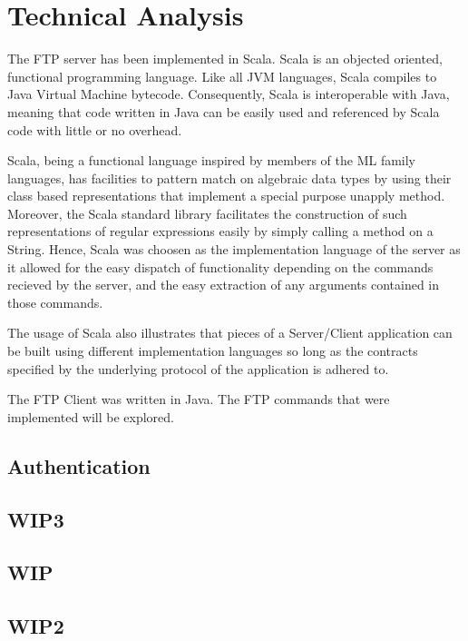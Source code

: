 \chapter{Technical Analysis}
The FTP server has been implemented in Scala. Scala is an objected oriented, functional programming language. Like all JVM languages, Scala compiles to Java Virtual Machine bytecode. Consequently, Scala is interoperable with Java, meaning that code written in Java can be easily used and referenced by Scala code with little or no overhead. 

Scala, being a functional language inspired by members of the ML family languages, has facilities to pattern match on algebraic data types by using their class based representations that implement a special purpose unapply method. Moreover, the Scala standard library facilitates the construction of such representations of regular expressions easily by simply calling a method on a String. Hence, Scala was choosen as the implementation language of the server as it allowed for the easy dispatch of functionality depending on the commands recieved by the server, and the easy extraction of any arguments contained in those commands.

The usage of Scala also illustrates that pieces of a Server/Client application can be built using different implementation languages so long as the contracts specified by the underlying protocol of the application is adhered to.

The FTP Client was written in Java. The FTP commands that were implemented will be explored.

\section{Authentication}



\section{WIP3}


\section{WIP}

\section{WIP2}
